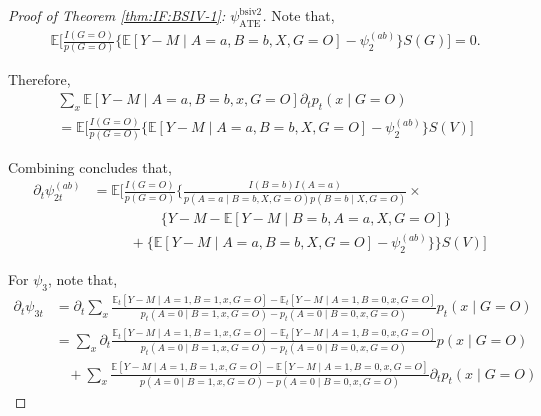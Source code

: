 \documentclass[10pt]{article}
\begin{document}
\begin{proof}[Proof of Theorem \ref{thm:IF:BSIV-1}: $\psi_{\text{ATE}}^{\text{bsiv2}}$]
Note that,
\begin{align*}
    &\mathbb{E}\bigg[\frac{I(G=O)}{p(G=O)}\bigg\{\mathbb{E}[Y-M\mid A=a,B=b,X,G=O]-\psi_2^{(ab)}\bigg\}S(G)\bigg]=0.
\end{align*}

Therefore,
\begin{align*}
    &\sum_{x}\mathbb{E}[Y-M\mid A=a,B=b,x,G=O]\partial_tp_t(x\mid G=O)\\
    &=\mathbb{E}\bigg[\frac{I(G=O)}{p(G=O)}\bigg\{\mathbb{E}[Y-M\mid A=a,B=b,X,G=O]-\psi_2^{(ab)}\bigg\}S(V)\bigg]
\end{align*}

Combining concludes that,
\begin{align*}
    \partial_t\psi_{2t}^{(ab)}&=\mathbb{E}\bigg[\frac{I(G=O)}{p( G=O)}\bigg\{\frac{I(B=b)I(A=a)}{p(A=a\mid B=b,X,G=O)p(B=b\mid X,G=O)}\times\\
    &~~~~~~~~~~~~~~~~~~~~~~ \{Y-M-\mathbb{E}[Y-M\mid B=b,A=a,X,G=O]\}\\
    &~~~~~~~~~~~~+\{\mathbb{E}[Y-M\mid A=a,B=b,X,G=O]-\psi_2^{(ab)}\}\bigg\}S(V)\bigg]
\end{align*}

For $\psi_3$, note that,
{\footnotesize \begin{align*}
    \partial_t\psi_{3t}&=\partial_t\sum_{x}\frac{\mathbb{E}_t[Y-M\mid A=1,B=1,x,G=O]-\mathbb{E}_t[Y-M\mid A=1,B=0,x,G=O]}{p_t(A=0\mid B=1,x,G=O)-p_t(A=0\mid B=0,x,G=O)}p_t(x\mid G=O)\\
    &=\sum_{x}\partial_t\frac{\mathbb{E}_t[Y-M\mid A=1,B=1,x,G=O]-\mathbb{E}_t[Y-M\mid A=1,B=0,x,G=O]}{p_t(A=0\mid B=1,x,G=O)-p_t(A=0\mid B=0,x,G=O)}p(x\mid G=O)\\
    &\ \ \ \ +\sum_{x}\frac{\mathbb{E}[Y-M\mid A=1,B=1,x,G=O]-\mathbb{E}[Y-M\mid A=1,B=0,x,G=O]}{p(A=0\mid B=1,x,G=O)-p(A=0\mid B=0,x,G=O)}\partial_tp_t(x\mid G=O)
\end{align*}}


\end{proof}
\end{document}
